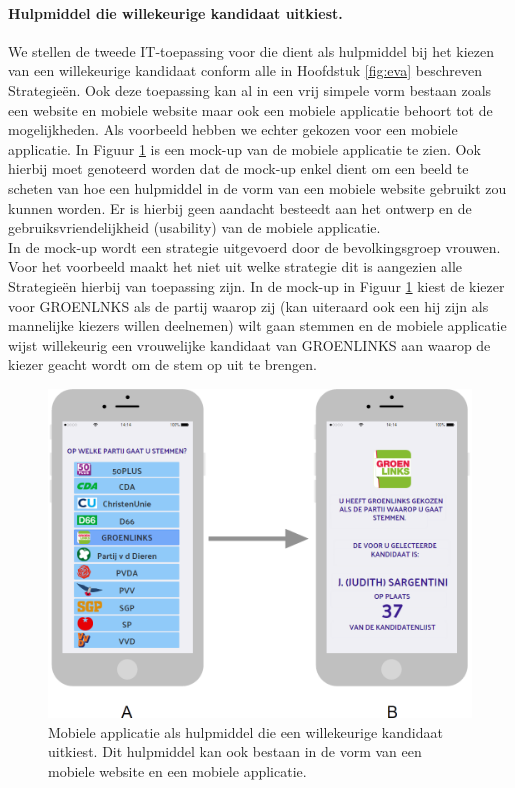 \paragraph{Hulpmiddel die willekeurige kandidaat uitkiest.}
We stellen de tweede IT-toepassing voor die dient als hulpmiddel bij het kiezen van een willekeurige kandidaat conform alle in Hoofdstuk \ref{fig:eva} beschreven Strategie\"{e}n. Ook deze toepassing kan al in een vrij simpele vorm bestaan zoals een website en mobiele website maar ook een mobiele applicatie behoort tot de mogelijkheden. Als voorbeeld hebben we echter gekozen voor een mobiele applicatie. In Figuur \ref{fig:verkA} is een mock-up van de mobiele applicatie te zien. Ook hierbij moet genoteerd worden dat de mock-up enkel dient om een beeld te scheten van hoe een hulpmiddel in de vorm van een mobiele website gebruikt zou kunnen worden. Er is hierbij geen aandacht besteedt aan het ontwerp en de gebruiksvriendelijkheid (usability) van de mobiele applicatie.\\
\indent In de mock-up wordt een strategie uitgevoerd door de bevolkingsgroep vrouwen. Voor het voorbeeld maakt het niet uit welke strategie dit is aangezien alle Strategie\"{e}n hierbij van toepassing zijn. In de mock-up in Figuur \ref{fig:verkA} kiest de kiezer voor GROENLNKS als de partij waarop zij (kan uiteraard ook een hij zijn als mannelijke kiezers willen deelnemen) wilt gaan stemmen en de mobiele applicatie wijst willekeurig een vrouwelijke kandidaat van GROENLINKS aan waarop de kiezer geacht wordt om de stem op uit te brengen. 


\begin{figure}[H]


	\includegraphics[width=\linewidth]{app_verkiezingen.png}

			\caption{Mobiele applicatie als hulpmiddel die een willekeurige kandidaat uitkiest. Dit hulpmiddel kan ook bestaan in de vorm van een mobiele website en een mobiele applicatie.}

\label{fig:verkA}
\end{figure}

